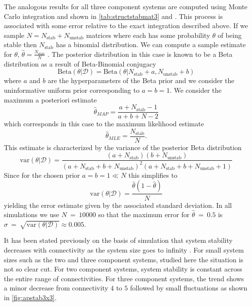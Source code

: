 The analogous results for all three component systems are computed using Monte Carlo integration and shown in \ref{tab:structstabmat3} and . This process is associated with some error relative to the exact integration described above. If we sample $N = N_{\mathrm{stab}} + N_{\mathrm{unstab}}$ matrices where each has some probability $\theta$ of being stable then $N_{\mathrm{stab}}$ has a binomial distribution. We can compute a sample estimate for $\theta$, $\hat{\theta} = \frac{N_{\mathrm{stab}}}{N}$ \cite{Murphy2012}. The posterior distribution in this case is known to be a Beta distribution as a result of Beta-Binomial conjugacy
$$
\mathrm{Beta}(\theta | \mathcal{D}) = \mathrm{Beta}(\theta | N_{\mathrm{stab}} + a, N_{\mathrm{unstab}} + b)
$$
where $a$ and $b$ are the hyperparameters of the Beta prior and we consider the uninformative uniform prior corresponding to $a=b=1$. We consider the maximum a posteriori estimate
$$\hat{\theta}_{MAP} = \frac{a + N_{\mathrm{stab}} - 1}{a + b + N - 2}$$
which corresponds in this case to the maximum likelihood estimate
$$
\hat{\theta}_{MLE} = \frac{N_{\mathrm{stab}}}{N}.
$$
This estimate is characterized by the variance of the posterior Beta distribution
$$
\mathrm{var}(\theta | \mathcal{D}) = \frac{(a+N_{\mathrm{stab}})(b+N_{\mathrm{unstab}})}{(a + N_{\mathrm{stab}} + b + N_{\mathrm{unstab}})^2(a + N_{\mathrm{stab}} + b + N_{\mathrm{unstab}}+1)}
$$
Since for the chosen prior $a=b=1 \ll N$ this simplifies to
$$
\mathrm{var}(\theta | \mathcal{D}) = \frac{\hat{\theta}(1-\hat{\theta})}{N}
$$
yielding the error estimate given by the associated standard deviation. In all simulations we use $N~=~10000$ so that the maximum error for $\hat{\theta}~=~0.5$ is $\sigma~=~\sqrt{\mathrm{var}(\theta | \mathcal{D})} \approx 0.005$.

It has been stated previously on the basis of simulation that system stability decreases with connectivity as the system size goes to infinity \cite{May1972}. For small system sizes such as the two and three component systems, studied here the situation is not so clear cut. For two component systems, system stability is constant across the entire range of connectivities. For three component systems, the trend shows a minor decrease from connectivity $4$ to $5$ followed by small fluctuations as shown in \ref{fig:apstab3x3}.

